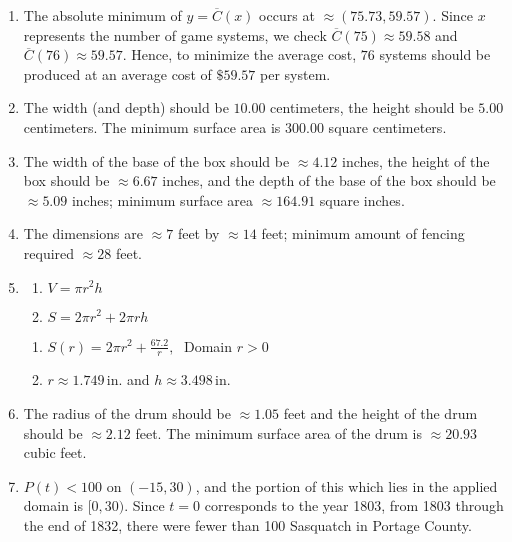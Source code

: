 \begin{enumerate}
\setcounter{enumi}{\value{HW}}

\item  The absolute minimum of $y=\overline{C}(x)$ occurs at $\approx (75.73, 59.57)$.  Since $x$ represents the number of game systems, we check $\overline{C}(75) \approx 59.58$ and $\overline{C}(76) \approx 59.57$.  Hence, to minimize the average cost, $76$ systems should be produced at an average cost of $\$59.57$ per system.

\item The width (and depth) should be $10.00$ centimeters, the height should be $5.00$ centimeters.  The minimum surface area is $300.00$ square centimeters.

\item The width of the base of the box should be $\approx 4.12$ inches, the height of the box should be $\approx 6.67$ inches, and the depth of the base of the box should be $\approx 5.09$ inches;  minimum surface area $\approx 164.91$ square inches.

\item The dimensions are  $\approx 7$ feet by $\approx 14$ feet;  minimum amount of fencing required $\approx 28$ feet.

\item 

\begin{multicols}{2}
\begin{enumerate}

\item $V = \pi r^{2}h$
\item $S = 2 \pi r^{2} + 2\pi r h$

\setcounter{HWindent}{\value{enumii}}
\end{enumerate}
\end{multicols}

\begin{multicols}{2}
\begin{enumerate}
\setcounter{enumii}{\value{HWindent}}

\item $S(r) = 2\pi r^{2} + \frac{67.2}{r}, \;$  Domain $r > 0$
\item $r \approx 1.749\,$in. and $h \approx 3.498\,$in. 

\end{enumerate}
\end{multicols}

\item  The radius of the drum should be $\approx 1.05$ feet and the height of the drum should be $\approx 2.12$ feet.  The minimum surface area of the drum is $\approx 20.93$ cubic feet.

\item $P(t) < 100$ on $(-15, 30)$, and the portion of this which lies in the applied domain is $[0,30)$.  Since $t=0$ corresponds to the year 1803, from 1803 through the end of 1832, there were fewer than 100 Sasquatch in Portage County.

\setcounter{HW}{\value{enumi}}
\end{enumerate}

